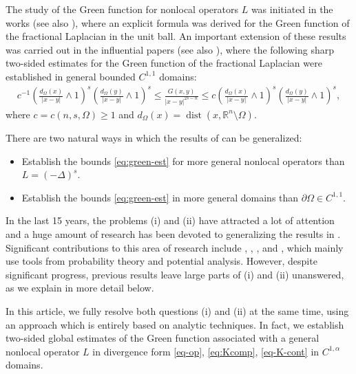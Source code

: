 \documentclass[11pt,reqno]{amsart}
\theoremstyle{plain}
\theoremstyle{definition}
\numberwithin{equation}{section}
\newcommand{\R}{\mathbb{R}}
\newcommand{\1}{\mathbbm{1}}
\DeclareMathOperator{\dist}{dist}
\begin{document}
The study of the Green function for nonlocal operators $L$ was initiated in the works \cite{Rie38,BGR61,Lan72} (see also \cite{Buc16}), where an explicit formula was derived for the Green function of the fractional Laplacian in the unit ball. An important extension of these results was carried out in the influential papers \cite{ChSo98,Kul97} (see also \cite{CKS10}), where the following sharp two-sided estimates for the Green function of the fractional Laplacian were established in general bounded $C^{1,1}$ domains:
    \begin{align}
    \label{eq:green-est}
        c^{-1}\left( \frac{d_{\Omega}(x)}{|x-y|} \wedge 1 \right)^s\left( \frac{d_{\Omega}(y)}{|x-y|} \wedge 1 \right)^s \le \frac{G(x,y)}{|x-y|^{2s-n}} \le c \left( \frac{d_{\Omega}(x)}{|x-y|} \wedge 1 \right)^s\left( \frac{d_{\Omega}(y)}{|x-y|}  \wedge 1 \right)^s,
    \end{align}
where $c=c(n, s, \Omega)\geq1$ and $d_{\Omega}(x) = \dist(x,\R^n \setminus \Omega)$.

There are two natural ways in which the results of \cite{ChSo98,Kul97,CKS10} can be generalized:
\begin{itemize}
    \item[(i)] Establish the bounds \eqref{eq:green-est} for more general nonlocal operators than $L = (-\Delta)^s$.
    \item[(ii)] Establish the bounds \eqref{eq:green-est} in more general domains than $\partial \Omega \in C^{1,1}$.
\end{itemize}

In the last 15 years, the problems (i) and (ii) have attracted a lot of attention and a huge amount of research has been devoted to generalizing the results in \cite{ChSo98,Kul97,CKS10}. Significant contributions to this area of research include \cite{CKS12,CKS14,BGR14,KiMi18}, \cite{KiKi14,GKK20,CKW22}, \cite{KSV25,CKSV24,KSV24}, and \cite{CHZ25}, which mainly use tools from probability theory and potential analysis. However, despite significant progress, previous results leave large parts of (i) and (ii) unanswered, as we explain in more detail below.

In this article, we fully resolve both questions (i) and (ii) at the same time, using an approach which is entirely based on analytic techniques. In fact, we establish two-sided global estimates of the Green function associated with a general nonlocal operator $L$ in divergence form \eqref{eq-op}, \eqref{eq:Kcomp}, \eqref{eq-K-cont} in $C^{1,\alpha}$ domains. 
\end{document}
